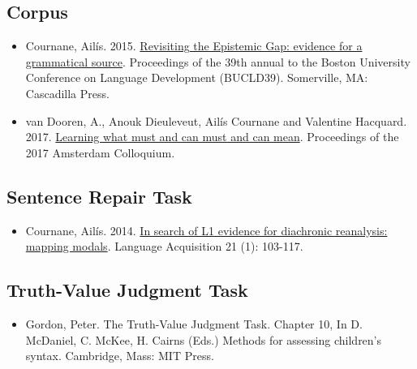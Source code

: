 \documentclass[
]{book}
\providecommand{\tightlist}{%
  \setlength{\itemsep}{0pt}\setlength{\parskip}{0pt}}
\begin{document}
\hypertarget{corpus}{%
\subsection*{Corpus}\label{corpus}}

\begin{itemize}
\item
  Cournane, Ailís. 2015. \href{https://s18798.pcdn.co/cournane/wp-content/uploads/sites/5271/2016/09/BUCLD-39-Proceedings_Cournane.pdf}{Revisiting the Epistemic Gap: evidence for a grammatical source}. Proceedings of the 39th annual to the Boston University Conference on Language Development (BUCLD39). Somerville, MA: Cascadilla Press.
\item
  van Dooren, A., Anouk Dieuleveut, Ailís Cournane and Valentine Hacquard. 2017. \href{https://s18798.pcdn.co/cournane/wp-content/uploads/sites/5271/2017/12/AC2017-Proceedings.pdf}{Learning what must and can must and can mean}. Proceedings of the 2017 Amsterdam Colloquium.
\end{itemize}

\hypertarget{sentence-repair-task}{%
\subsection*{Sentence Repair Task}\label{sentence-repair-task}}

\begin{itemize}
\tightlist
\item
  Cournane, Ailís. 2014. \href{https://www.tandfonline.com/doi/full/10.1080/10489223.2013.855218}{In search of L1 evidence for diachronic reanalysis: mapping modals}. Language Acquisition 21 (1): 103-117.
\end{itemize}

\hypertarget{truth-value-judgment-task}{%
\subsection*{Truth-Value Judgment Task}\label{truth-value-judgment-task}}

\begin{itemize}
\tightlist
\item
  Gordon, Peter. The Truth-Value Judgment Task. Chapter 10, In D. McDaniel, C. McKee, H. Cairns (Eds.) Methods for assessing children's syntax. Cambridge, Mass: MIT Press.
\end{itemize}
\end{document}
